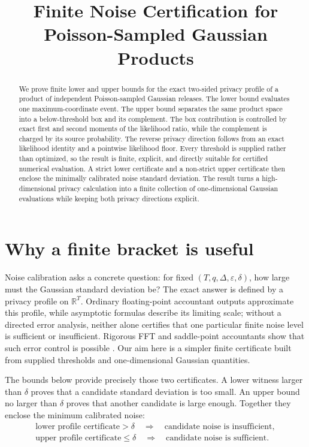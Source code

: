 \documentclass[11pt]{article}
\title{Finite Noise Certification for Poisson-Sampled Gaussian Products}
\author{}
\date{}
\theoremstyle{remark}
\newcommand{\R}{\mathbb R}
\begin{document}
\maketitle

\begin{abstract}
We prove finite lower and upper bounds for the exact two-sided privacy
profile of a product of independent Poisson-sampled Gaussian releases.  The
lower bound evaluates one maximum-coordinate event.  The upper bound separates
the same product space into a below-threshold box and its complement.  The
box contribution is controlled by exact first and second moments of the
likelihood ratio, while the complement is charged by its source probability.
The reverse privacy direction follows from an exact likelihood identity and
a pointwise likelihood floor.  Every threshold is supplied rather than
optimized, so the result is finite, explicit, and directly suitable for
certified numerical evaluation.  A strict lower certificate and a non-strict
upper certificate then enclose the minimally calibrated noise standard
deviation.  The result turns a high-dimensional privacy calculation into a
finite collection of one-dimensional Gaussian evaluations while keeping both
privacy directions explicit.
\end{abstract}

\section{Why a finite bracket is useful}

Noise calibration asks a concrete question: for fixed
$(T,q,\Delta,\varepsilon,\delta)$, how large must the Gaussian standard
deviation be?  The exact answer is defined by a privacy profile on
$\R^T$.  Ordinary floating-point accountant outputs approximate this
profile, while asymptotic formulas describe its limiting scale; without a
directed error analysis, neither alone certifies that one particular finite
noise level is sufficient or insufficient.  Rigorous FFT and saddle-point
accountants show that such error control is possible
\cite{KoskelaEtAl2021,AlghamdiEtAl2023}.  Our aim here is a simpler finite
certificate built from supplied thresholds and one-dimensional Gaussian
quantities.

The bounds below provide precisely those two certificates.  A lower witness
larger than $\delta$ proves that a candidate standard deviation is too small.
An upper bound no larger than $\delta$ proves that another candidate is large
enough.  Together they enclose the minimum calibrated noise:
\[
  \boxed{
  \begin{array}{c}
    \text{lower profile certificate}>\delta
      \quad\Longrightarrow\quad
      \text{candidate noise is insufficient},\\[1mm]
    \text{upper profile certificate}\leq\delta
      \quad\Longrightarrow\quad
      \text{candidate noise is sufficient}.
  \end{array}}
\]
\end{document}
